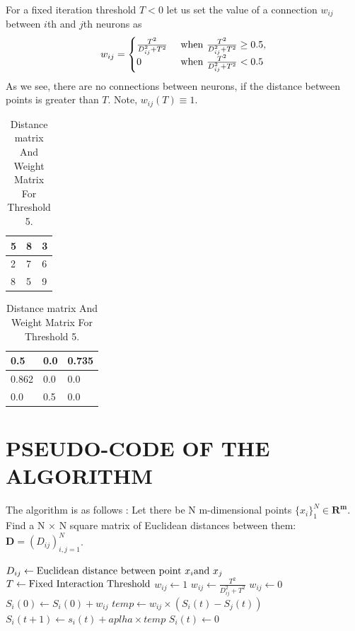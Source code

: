 \documentclass[letterpaper, 10 pt, conference]{ieeeconf}  %
\begin{document}
For a fixed iteration threshold $T < 0$ let us set the value of a connection $w_{ij}$ between $i$th and $j$th neurons as 
\[ w_{ij}=\begin{cases} 
      \frac{T^2}{D_{ij}^2 + T^2} &\textnormal{ when } \frac{T^2}{D_{ij}^2 + T^2}\geq 0.5, \\
      0 &\textnormal{ when }\frac{T^2}{D_{ij}^2 + T^2} < 0.5 
   \end{cases}
\]
As we see, there are no connections between neurons, if the distance between points is greater than $T$. Note, $w_{ij}\left(T\right) \equiv1$.

\begin{table}[htb]
\centering
\begin{tabular}{|l|l|l|}
\hline
5 & 8 & 3 \\ \hline
2 & 7 & 6 \\ \hline
8 & 5 & 9 \\ \hline
\end{tabular}
\hspace{1cm} 
\begin{tabular}{|l|l|l|}
\hline
0.5 & 0.0 & 0.735 \\ \hline
0.862 & 0.0 & 0.0 \\ \hline
0.0 & 0.5 & 0.0 \\ \hline
\end{tabular}
\caption{Distance matrix And Weight Matrix For Threshold 5.}
\label{my-label}
\end{table}

\section{PSEUDO-CODE OF THE ALGORITHM}
The algorithm is as follows :
 Let there be N  m-dimensional points $\{x_i\}_1^N\in \textbf{R}^\textbf{m}$. Find a  N $\times$ N square matrix of Euclidean distances between them:$\textbf{D}=\left(D_{ij}\right)_{i,j=1}^N$.\\
 
 \begin{algorithmic}
 
 
 \STATE $D_{ij} \leftarrow \textnormal{Euclidean distance between point } x_i \textnormal{and } x_j$
 \ENDFOR
 \ENDFOR
 \STATE
 \STATE $T \leftarrow \textnormal{Fixed Interaction Threshold}$
 \STATE
\STATE $w_{ij} \leftarrow 1$
\STATE $w_{ij} \leftarrow \frac{T^2}{D_{ij}^2 + T^2}$
\ELSE
\STATE $w_{ij} \leftarrow 0$
\ENDIF
\STATE $S_i\left(0\right) \leftarrow S_i\left(0\right) + w_{ij}$
\ENDFOR
\ENDFOR
\STATE
{}
 \STATE $temp \leftarrow w_{ij} \times\left(S_i\left(t\right)-S_j\left(t\right)\right)$
 \ENDFOR
 \STATE $S_i\left(t+1\right) \leftarrow s_i\left(t\right) + aplha\times{temp}$
\STATE $S_i\left(t\right) \leftarrow 0$
\ENDIF
 \ENDFOR
 \end{algorithmic}
\end{document}
